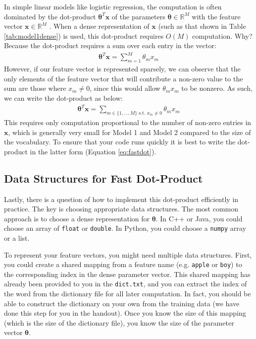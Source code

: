 \documentclass[11pt]{exam}
\numberwithin{equation}{section} %
\numberwithin{figure}{section} %
\numberwithin{table}{section} %
\newcommand{\Rb}{\mathbb{R}}
\newcommand{\xv}{\mathbf{x}}
\newcommand{\thetav     }{\boldsymbol \theta     }
\begin{document}
In simple linear models like logistic regression, the computation is often dominated by the dot-product $\thetav^T \xv$ of the parameters $\thetav \in \Rb^M$ with the feature vector $\xv \in \Rb^M$ . When a dense representation of $\xv$ (such as that shown in Table \ref{tab:model1dense}) is used, this dot-product requires $O(M)$ computation. Why? Because the dot-product requires a sum over each entry in the vector:
\begin{align}
\thetav^T \xv = \sum_{m=1}^M \theta_m x_m
\end{align}
%
However, if our feature vector is represented sparsely, we can observe that the only elements of the feature vector that will contribute a non-zero value to the sum are those where $x_m \neq 0$, since this would allow $\theta_m x_m$ to be nonzero. As such, we can write the dot-product as below:
\begin{align}
\thetav^T \xv = \sum_{m \in \{1,\ldots,M\} \text{ s.t. } x_m \neq 0} \theta_m x_m
\label{eq:fastdot}
\end{align}
This requires only computation proportional to the number of non-zero entries in $\xv$, which is generally very small for Model 1 and Model 2 compared to the size of the vocabulary. To ensure that your code runs quickly it is best to write the dot-product in the latter form (Equation \eqref{eq:fastdot}).

\subsection{Data Structures for Fast Dot-Product} \label{datastructuredp}

Lastly, there is a question of how to implement this dot-product efficiently in practice. The key is choosing appropriate data structures. The most common approach is to choose a dense representation for $\thetav$. In C++ or Java, you could choose an array of \lstinline{float} or \lstinline{double}. In Python, you could choose a \lstinline{numpy} array or a list. 

To represent your feature vectors, you might need multiple data structures. First, you could create a shared mapping from a feature  name (e.g. {\tt apple} or {\tt boy}) to the corresponding index in the dense parameter vector. This shared mapping has already been provided to you in the \lstinline{dict.txt}, and you can extract the index of the word from the dictionary file for all later computation. In fact, you should be able to construct the dictionary on your own from the training data (we have done this step for you in the handout). Once you know the size of this mapping (which is the size of the dictionary file), you know the size of the parameter vector $\thetav$. 
\end{document}
